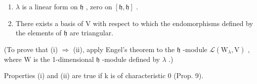 \begin{enumerate}
\def\labelenumi{(\roman{enumi})}
\item
  \(\lambda\) is a linear form on \(\mathfrak{h}\) , zero on \([\mathfrak{h},\mathfrak{h}]\) .
\item
  There exists a basis of \(\mathrm{V}\) with respect to which the endomorphisms defined by the elements of \(\mathfrak{h}\) are triangular.
\end{enumerate}

(To prove that (i) \(\Longrightarrow\) (ii), apply Engel's theorem to the \(\mathfrak{h}\) -module \(\mathcal{L}(\mathrm{W}_{\lambda},\mathrm{V})\) , where \(\mathrm{W}\) is the 1-dimensional \(\mathfrak{h}\) -module defined by \(\lambda\) .)

Properties (i) and (ii) are true if k is of characteristic 0 (Prop. 9).

